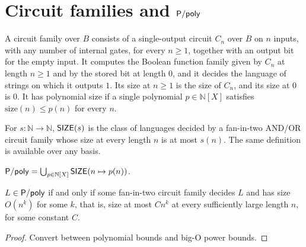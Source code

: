 \section{Circuit families and $\cc{P/poly}$}
\label{sec:circuits-families}

\begin{definition}
  \label{def:circuits-family}
  \leanok
  A circuit family over $B$ consists of a single-output circuit $C_n$ over $B$
  on $n$ inputs, with any number of internal gates, for every $n \ge 1$,
  together with an output bit for the empty input. It computes the Boolean
  function family given by $C_n$ at length $n \ge 1$ and by the stored bit at
  length $0$, and it decides the language of strings on which it outputs $1$. Its size at $n \ge 1$ is the size of $C_n$,
  and its size at $0$ is $0$. It has polynomial size if a single polynomial
  $p \in \mathbb{N}[X]$ satisfies $\mathrm{size}(n) \le p(n)$ for every $n$.
\end{definition}

\begin{definition}[$\cc{SIZE}$]
  \label{def:SIZE}
  \leanok
  For $s : \mathbb{N} \to \mathbb{N}$, $\mathsf{SIZE}(s)$ is the class of languages
  decided by a fan-in-two AND/OR circuit family whose size at every length $n$
  is at most $s(n)$. The same definition is available over any basis.
\end{definition}

\begin{definition}[$\cc{P/poly}$]
  \label{def:PPoly}
  \leanok
  $\mathsf{P/poly} = \bigcup_{p \in \mathbb{N}[X]} \mathsf{SIZE}(n \mapsto p(n))$.
\end{definition}

\begin{proposition}
  \label{prop:circuits-ppoly-bigo}
  \leanok
  $L \in \mathsf{P/poly}$ if and only if some fan-in-two circuit family decides $L$
  and has size $O(n^k)$ for some $k$, that is, size at most $C n^k$ at every
  sufficiently large length $n$, for some constant $C$.
\end{proposition}
\begin{proof}
  \leanok
  Convert between polynomial bounds and big-O power bounds.
\end{proof}

